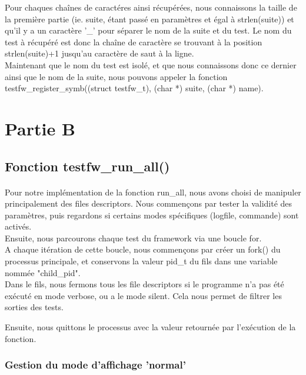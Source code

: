 \documentclass[12pt]{article}
\begin{document}
Pour chaques chaînes de caractéres ainsi récupérées, nous connaissons la taille de la première partie (ie. suite, étant passé en paramètres et égal à strlen(suite)) et qu'il y a un caractère '\_' pour séparer le nom de la suite et du test. Le nom du test à récupéré est donc la chaîne de caractère se trouvant à la position strlen(suite)+1 jusqu'au caractère de saut à la ligne.\\

Maintenant que le nom du test est isolé, et que nous connaissons donc ce dernier ainsi que le nom de la suite, nous pouvons appeler la fonction testfw\_register\_symb((struct testfw\_t), (char *) suite, (char *) name).\\


\newpage
\section{Partie B}
\subsection{Fonction testfw\_run\_all()}

\paragraph{}
Pour notre implémentation de la fonction run\_all, nous avons choisi de manipuler principalement des files descriptors. Nous commençons par tester la validité des paramètres, puis regardons si certains modes spécifiques (logfile, commande) sont activés.\\

Ensuite, nous parcourons chaque test du framework via une boucle for.\\
A chaque itération de cette boucle, nous commençons par créer un fork() du processus principale, et conservons la valeur pid\_t du fils dans une variable nommée "child\_pid".\\

Dans le fils, nous fermons tous les file descriptors si le programme n'a pas été exécuté en mode verbose, ou a le mode silent. Cela nous permet de filtrer les sorties des tests.

Ensuite, nous quittons le processus avec la valeur retournée par l'exécution de la fonction.\\


\subsubsection{Gestion du mode d'affichage 'normal'}
\end{document}

